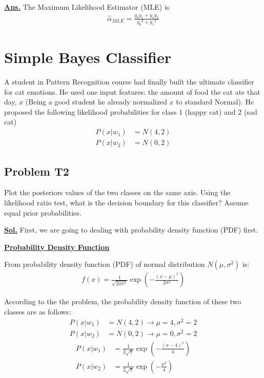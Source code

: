 \documentclass[12pt, a4paper]{article}
\newcommand{\sol}{\par\noindent\underline{\textbf{Sol.}} }
\newcommand{\ans}{\par\noindent\underline{\textbf{Ans.}} }
\begin{document}
            \ans The Maximum Likelihood Estimator (MLE) is
            \begin{align*}
                {\hat{\alpha}}_{MLE} = \frac{y_{0}y_{1} + y_{1}y_{2}}{{y_{0}}^{2} + {y_{1}}^{2}}
            \end{align*}

    \pagebreak

    \section{Simple Bayes Classifier}

        A student in Pattern Recognition course had finally built the ultimate classifier for cat emotions. He used one input features: the amount of food the cat ate that day, $x$ (Being a good student he already normalized $x$ to standard Normal). He proposed the following likelihood probabilities for class 1 (happy cat) and 2 (sad cat)
        \begin{align*}
            P(x|w_1) &= N(4, 2) \\
            P(x|w_2) &= N(0, 2)
        \end{align*}

        \subsection{Problem T2}
            Plot the posteriors values of the two classes on the same axis. Using the likelihood ratio test, what is the decision boundary for this classifier? Assume equal prior probabilities.

            \vspace{1em}

            \sol First, we are going to dealing with probability density function (PDF) first.
            \vspace{1em}

            \noindent\underline{\textbf{Probability Density Function}}
            \vspace{0.5em}

            From probability density function (PDF) of normal distribution $N(\mu, \sigma^{2})$ is:
            \begin{align*}
                f(x) = \frac{1}{\sqrt{2\pi\sigma^{2}}} \exp\left( -\frac{(x - \mu)^{2}}{2\sigma^{2}} \right)
            \end{align*}
            
            According to the the problem, the probability density function of these two classes are as follows:
            \begin{align*}
                P(x|w_1) &= N(4, 2) \rightarrow \mu = 4, {\sigma}^{2} = 2 \\
                P(x|w_2) &= N(0, 2) \rightarrow \mu = 0, {\sigma}^{2} = 2
            \end{align*}
            \begin{align*}
                P(x|w_1) &= \frac{1}{2\sqrt{\pi}} \exp\left( -\frac{(x - 4)^{2}}{4} \right) \\[1em]
                P(x|w_2) &= \frac{1}{2\sqrt{\pi}} \exp\left( -\frac{{x}^{2}}{4} \right)
            \end{align*}
\end{document}
